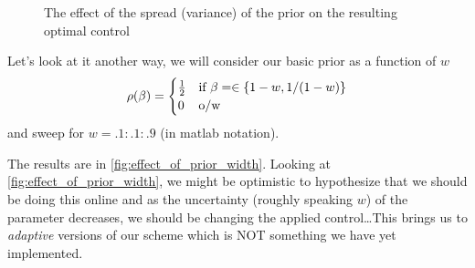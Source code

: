 \documentclass{article}
\begin{document}
\begin{figure}[h]
\begin{center}
\caption[labelInTOC]{The effect of the spread (variance) of the prior on the
resulting optimal control}
\label{fig:prior_spread}
\end{center}
\end{figure}

Let's look at it another way, we will consider our basic prior as a function of
$w$
\begin{equation}
\rho({\beta}) = 
\begin{cases}
	\tfrac 12 & \textrm{if } {\beta}= \in \{1- w, 1/(1-w) \}\\
	0   &\textrm{o/w }
\end{cases} 
\end{equation} 
and sweep for $w = .1:.1:.9$ (in matlab notation).

The results are in \cref{fig:effect_of_prior_width}. Looking at
\cref{fig:effect_of_prior_width}, we might be optimistic to hypothesize that we
should be doing this online and as the uncertainty (roughly speaking $w$) of the
parameter decreases, we should be changing the applied control\ldots This
brings us to {\sl adaptive } versions of our scheme which is NOT something we
have yet implemented. 
 
\end{document}

